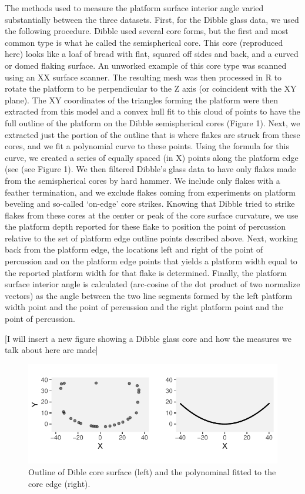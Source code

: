 \documentclass[10pt,letterpaper]{article}
\begin{document}
The methods used to measure the platform surface interior angle varied
substantially between the three datasets. First, for the Dibble glass
data, we used the following procedure. Dibble used several core forms,
but the first and most common type is what he called the semispherical
core. This core (reproduced here) looks like a loaf of bread with flat,
squared off sides and back, and a curved or domed flaking surface. An
unworked example of this core type was scanned using an XX surface
scanner. The resulting mesh was then processed in R to rotate the
platform to be perpendicular to the Z axis (or coincident with the XY
plane). The XY coordinates of the triangles forming the platform were
then extracted from this model and a convex hull fit to this cloud of
points to have the full outline of the platform on the Dibble
semispherical cores (Figure 1). Next, we extracted just the portion of
the outline that is where flakes are struck from these cores, and we fit
a polynomial curve to these points. Using the formula for this curve, we
created a series of equally spaced (in X) points along the platform edge
(see (see Figure 1). We then filtered Dibble's glass data to have only
flakes made from the semispherical cores by hard hammer. We include only
flakes with a feather termination, and we exclude flakes coming from
experiments on platform beveling and so-called `on-edge' core strikes.
Knowing that Dibble tried to strike flakes from these cores at the
center or peak of the core surface curvature, we use the platform depth
reported for these flake to position the point of percussion relative to
the set of platform edge outline points described above. Next, working
back from the platform edge, the locations left and right of the point
of percussion and on the platform edge points that yields a platform
width equal to the reported platform width for that flake is determined.
Finally, the platform surface interior angle is calculated (arc-cosine
of the dot product of two normalize vectors) as the angle between the
two line segments formed by the left platform width point and the point
of percussion and the right platform point and the point of percussion.

{[}I will insert a new figure showing a Dibble glass core and how the
measures we talk about here are made{]}

\begin{figure}
\centering
\includegraphics{PSIA_Manuscript_files/figure-latex/fig1-core_outlines-1.pdf}
\caption{Outline of Dible core surface (left) and the polynominal fitted
to the core edge (right).}
\end{figure}
\end{document}

